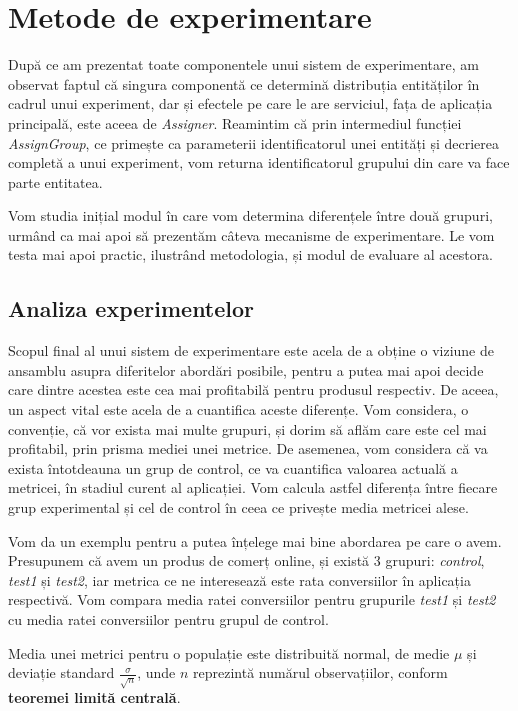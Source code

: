 \chapter{Metode de experimentare}

După ce am prezentat toate componentele unui sistem de experimentare, am observat faptul că singura componentă ce determină distribuția entităților în cadrul unui experiment, dar și efectele pe care le are serviciul, fața de aplicația principală, este aceea de \textit{Assigner}. Reamintim că prin intermediul funcției \textit{AssignGroup}, ce primește ca parameterii identificatorul unei entități și decrierea completă a unui experiment, vom returna identificatorul grupului din care va face parte entitatea. 

Vom studia inițial modul în care vom determina diferențele între două grupuri, urmând ca mai apoi să prezentăm câteva mecanisme de experimentare. Le vom testa mai apoi practic, ilustrând metodologia, și modul de evaluare al acestora.

\section{Analiza experimentelor}

Scopul final al unui sistem de experimentare este acela de a obține o viziune de ansamblu asupra diferitelor abordări posibile, pentru a putea mai apoi decide care dintre acestea este cea mai profitabilă pentru produsul respectiv. De aceea, un aspect vital este acela de a cuantifica aceste diferențe. Vom considera, o convenție, că vor exista mai multe grupuri, și dorim să aflăm care este cel mai profitabil, prin prisma mediei unei metrice. De asemenea, vom considera că va exista întotdeauna un grup de control, ce va cuantifica valoarea actuală a metricei, în stadiul curent al aplicației. Vom calcula astfel diferența între fiecare grup experimental și cel de control în ceea ce privește media metricei alese.

Vom da un exemplu pentru a putea înțelege mai bine abordarea pe care o avem. Presupunem că avem un produs de comerț online, și există 3 grupuri: \textit{control}, \textit{test1} și \textit{test2}, iar metrica ce ne interesează este rata conversiilor în aplicația respectivă. Vom compara media ratei conversiilor pentru grupurile \textit{test1} și \textit{test2} cu media ratei conversiilor pentru grupul de control.

\begin{remark}
	Media unei metrici pentru o populație este distribuită normal, de medie ${\mu}$ și deviație standard $\frac{\sigma}{\sqrt{n}}$, unde $n$ reprezintă numărul observațiilor, conform \textbf{teoremei limită centrală}.
\end{remark}

